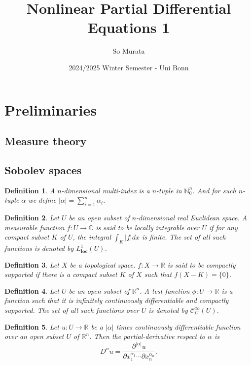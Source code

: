 \documentclass{article}
\title{Nonlinear Partial Differential Equations 1}
\author{So Murata}
\date{2024/2025 Winter Semester - Uni Bonn}
\newtheorem{definition}{Definition}[section]
\numberwithin{equation}{section}
\begin{document}
\maketitle

\section{Preliminaries}

\subsection{Measure theory}

\subsection{Sobolev spaces}

\begin{definition}
A $n$-dimensional multi-index is a $n$-tuple in $\mathbb{N}_0^n$. And for such $n$-tuple $\alpha$ we define $|\alpha| = \sum_{i=1}^n \alpha_i$. 
\end{definition}

\begin{definition}
Let $U$ be an open subset of $n$-dimensional real Euclidean space. A measurable function $f:U\to\mathbb{C}$ is said to be locally integrable over $U$ if for any compact subset $K$ of $U$, the integral $\int_K|f|dx$ is finite. The set of all such functions is denoted by $L^1_{\mathbf{loc}}(U)$.
\end{definition}

\begin{definition}
Let $X$ be a topological space. $f:X\to\mathbb{R}$ is said to be compactly supported if there is a compact subset $K$ of $X$ such that $f(X-K) = \{0\}$. 
\end{definition}

\begin{definition}
Let $U$ be an open subset of $\mathbb{R}^n$. A test function $\phi:U\to\mathbb{R}$ is a function such that it is infinitely continuously differentiable and compactly supported. The set of all such functions over $U$ is denoted by $\mathcal{C}^\infty_C(U)$.
\end{definition}

\begin{definition}
Let $u:U\to\mathbb{R}$ be a $|\alpha|$ times continuously differentiable function over an open subset $U$ of $\mathbb{R}^n$. Then the partial-derivative respect to $\alpha$ is 
\begin{equation*}
D^\alpha u= {\frac {\partial^{|\alpha|}u} {\partial x_1^{\alpha_1}\cdots\partial x_n^{\alpha_n}}}.
\end{equation*}
\end{definition}
\end{document}
